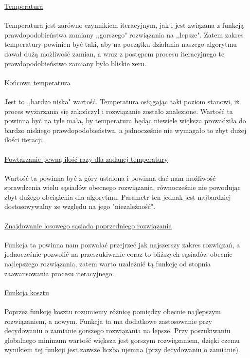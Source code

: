 \documentclass[twoside]{projektInzynierskiMS1}
\newcommand{\newLine}{~\\}
\newcommand{\si}{ś}
\begin{document}
\noindent \underline{Temperatura} \\ \newLine
\indent Temperatura jest zarówno czynnikiem iteracyjnym, jak i jest związana z funkcją prawdopodobieństwa zamiany ,,gorszego" rozwiązania na ,,lepsze". Zatem zakres temperatury powinien być taki, aby na początku działania naszego algorytmu dawał dużą możliwość zamian, a wraz z postępem procesu iteracyjnego te prawdopodobieństwo zamiany było bliskie zeru.\\ \newLine


\noindent \underline{Końcowa temperatura} \\ \newLine
\indent Jest to ,,bardzo niska" wartość. Temperatura osiągając taki poziom stanowi, iż proces wyżarzania się zakończył i rozwiązanie zostało znalezione.
Wartość ta powinna być na tyle mała, by temperatura będąc niewiele większa prowadziła do bardzo niskiego prawdopodobieństwa, a jednocze\si nie nie wymagało to zbyt dużej ilo\si ci iteracji. \\ \newLine


\noindent \underline{Powtarzanie pewną ilość razy dla zadanej temperatury} \\ \newLine
\indent Wartość ta powinna być z góry ustalona i powinna dać nam możliwość sprawdzenia wielu sąsiadów obecnego rozwiązania, równocześnie nie powodując zbyt dużego obciążenia dla algorytmu. Parametr ten jednak jest najbardziej dostosowywalny ze względu na jego "niezależno\si ć". \\ \newLine


\noindent \underline{Znajdowanie losowego sąsiada poprzedniego rozwiązania} \\ \newLine
\indent Funkcja ta powinna nam pozwalać przejrzeć jak najszerszy zakres rozwiązań, a jednocze\si nie pozwolić na przeszukiwanie coraz to bliższych sąsiadów obecnie najlepszego rozwiązania, zatem warto uzależnić tą funkcję od stopnia zaawansowania procesu iteracyjnego.\\ \newLine


\noindent \underline{Funkcja kosztu} \\ \newLine
\indent Poprzez funkcję kosztu rozumiemy różnicę pomiędzy obecnie najlepszym rozwiązaniem, a nowym. Funkcja ta ma dodatkowe zastosowanie przy decydowaniu o zamianie gorszego rozwiązania na lepsze. Przy poszukiwaniu globalnego minimum warto\si ć większa jest gorszym rozwiązaniem, dzięki czemu wynikiem tej funkcji jest zawsze liczba ujemna (przy decydowaniu o zamianie). \\ \newLine  \\ \newLine
\end{document}

